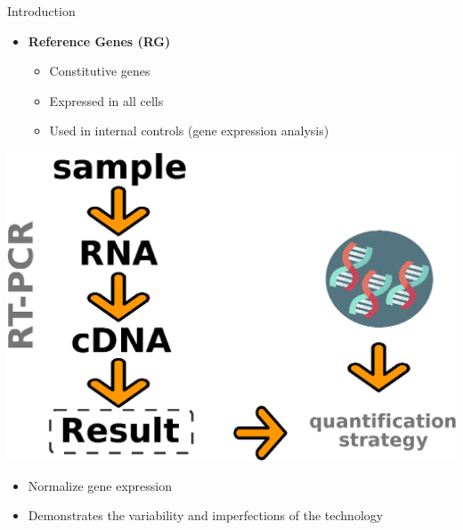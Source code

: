 \begin{frame}{Introduction}
\begin{center}
\begin{itemize}
    \item \textbf{Reference Genes (RG)} 
    \begin{itemize}
        \item Constitutive genes
        \vspace{3pt}
        \item Expressed in all cells
        \vspace{3pt}
        \item Used in internal controls (gene expression analysis)
    \end{itemize}
\end{itemize}
\vspace{5pt}
\includegraphics[scale=.3]{figures/rt_pcr.eps}
\begin{itemize}
    \item Normalize gene expression
    \item Demonstrates the variability and imperfections of the technology
\end{itemize}

\end{center}
\end{frame}

